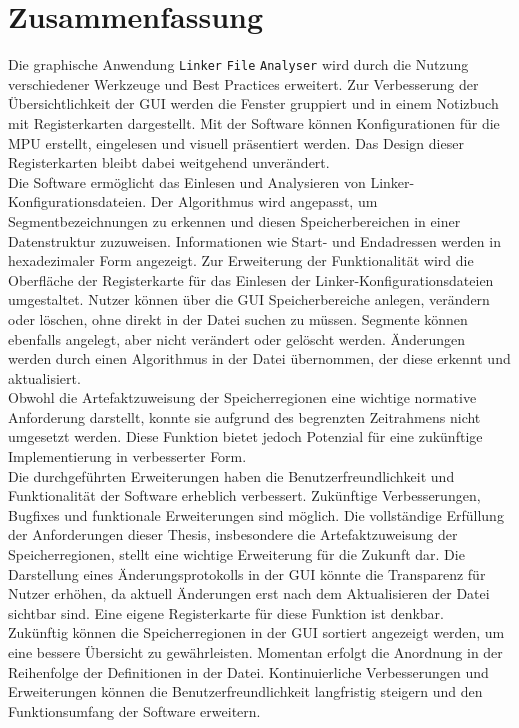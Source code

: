 \section{Zusammenfassung}\label{kap:zusammenfassung}

Die graphische Anwendung \verb*|Linker| \verb*|File| \verb*|Analyser| wird durch die Nutzung verschiedener Werkzeuge und Best Practices erweitert. 
Zur Verbesserung der Übersichtlichkeit der \ac{GUI} werden die Fenster gruppiert und in einem Notizbuch mit Registerkarten dargestellt. 
Mit der Software können Konfigurationen für die \ac{MPU} erstellt, eingelesen und visuell präsentiert werden. 
Das Design dieser Registerkarten bleibt dabei weitgehend unverändert. \\

Die Software ermöglicht das Einlesen und Analysieren von Linker-Konfigurationsdateien. 
Der Algorithmus wird angepasst, um Segmentbezeichnungen zu erkennen und diesen Speicherbereichen in einer Datenstruktur zuzuweisen. 
Informationen wie Start- und Endadressen werden in hexadezimaler Form angezeigt. 
Zur Erweiterung der Funktionalität wird die Oberfläche der Registerkarte für das Einlesen der Linker-Konfigurationsdateien umgestaltet.
Nutzer können über die \ac{GUI} Speicherbereiche anlegen, verändern oder löschen, ohne direkt in der Datei suchen zu müssen.
Segmente können ebenfalls angelegt, aber nicht verändert oder gelöscht werden.
Änderungen werden durch einen Algorithmus in der Datei übernommen, der diese erkennt und aktualisiert. \\

Obwohl die Artefaktzuweisung der Speicherregionen eine wichtige normative Anforderung darstellt, konnte sie aufgrund des begrenzten Zeitrahmens nicht umgesetzt werden. 
Diese Funktion bietet jedoch Potenzial für eine zukünftige Implementierung in verbesserter Form. \\

Die durchgeführten Erweiterungen haben die Benutzerfreundlichkeit und Funktionalität der Software erheblich verbessert. 
Zukünftige Verbesserungen, Bugfixes und funktionale Erweiterungen sind möglich. 
Die vollständige Erfüllung der Anforderungen dieser Thesis, insbesondere die Artefaktzuweisung der Speicherregionen, stellt eine wichtige Erweiterung für die Zukunft dar. 
Die Darstellung eines Änderungsprotokolls in der \ac{GUI} könnte die Transparenz für Nutzer erhöhen, da aktuell Änderungen erst nach dem Aktualisieren der Datei sichtbar sind. 
Eine eigene Registerkarte für diese Funktion ist denkbar. \\

Zukünftig können die Speicherregionen in der \ac{GUI} sortiert angezeigt werden, um eine bessere Übersicht zu gewährleisten.
Momentan erfolgt die Anordnung in der Reihenfolge der Definitionen in der Datei. 
Kontinuierliche Verbesserungen und Erweiterungen können die Benutzerfreundlichkeit langfristig steigern und den Funktionsumfang der Software erweitern.